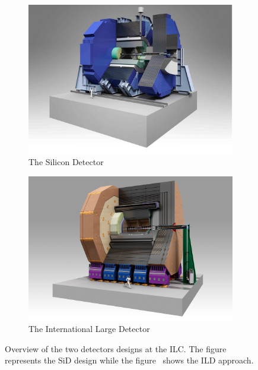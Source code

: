     \begin{figure}[!h]
      \centering
      \begin{subfigure}[t]{0.5\textwidth}
        \includegraphics[width = \textwidth]{Pictures/ILC/SiD.jpg}
        \caption{\label{fig:SiD} The Silicon Detector}
      \end{subfigure}
      \begin{subfigure}[t]{0.5\textwidth}
        \includegraphics[width = 1.03\textwidth]{Pictures/ILC/ILD.jpg}
        \caption{\label{fig:ILD} The International Large Detector}
      \end{subfigure}
      \caption{Overview of the two detectors designs at the ILC. The figure~ represents the SiD design while the figure~ shows the ILD approach.}
      \label{fig:SiD}

    \end{figure}    

